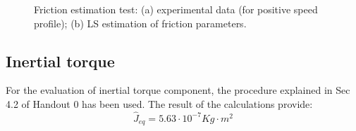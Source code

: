 \documentclass[11pt]{article}
\begin{document}
		\begin{figure}[h!]
		\centering
		\quad
		\caption{Friction estimation test: (a) experimental data (for positive speed profile); (b) LS estimation of friction parameters.}
		\end{figure}

	\subsection{Inertial torque}
	For the evaluation of inertial torque component, the procedure explained in Sec 4.2 of Handout 0 has been used. The result of the calculations provide:
	\begin{equation}
		\hat J_{eq} = 5.63\cdot10^{-7}Kg\cdot m^2
	\end{equation}
\end{document}
